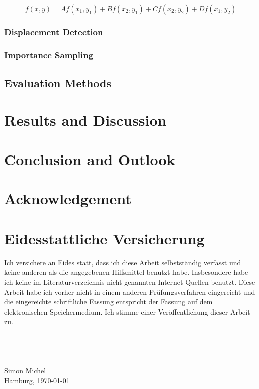 \documentclass[11pt,twoside,a4paper,fleqn]{report}
\numberwithin{equation}{chapter}
\numberwithin{figure}{chapter}
\numberwithin{table}{chapter}
\begin{document}
\begin{equation}
	f(x,y) = Af(x_1,y_1)+Bf(x_2,y_1)+Cf(x_2,y_2)+Df(x_1,y_2)
\end{equation}
\subsection{Displacement Detection}
\subsection{Importance Sampling}
\section{Evaluation Methods}
\chapter{Results and Discussion}
\chapter{Conclusion and Outlook}
\chapter{Acknowledgement}

\chapter{Eidesstattliche Versicherung}
Ich versichere an Eides statt, dass ich diese Arbeit selbstständig verfasst und keine anderen als die angegebenen Hilfsmittel benutzt habe. Insbesondere habe ich keine im Literaturverzeichnis nicht genannten Internet-Quellen benutzt. Diese Arbeit habe ich vorher nicht in einem anderen Prüfungsverfahren eingereicht und die eingereichte schriftliche Fassung entspricht der Fassung auf dem elektronischen Speichermedium. Ich stimme einer Veröffentlichung dieser Arbeit zu.
\\
\\
\\
\\
\\
Simon Michel\\
Hamburg, \today
\end{document}
